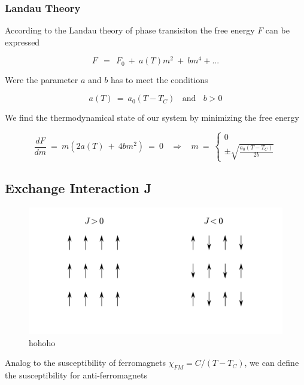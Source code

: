 \documentclass[10pt]{report}
\numberwithin{equation}{chapter}
\begin{document}
\subsubsection{Landau Theory}

According to the Landau theory of phase transisiton the free energy $F$ can be expressed

\begin{equation} \label{eq:ferromag_landau}
  F ~~=~~ F_0 ~+~ a(T) m^2 ~+~ b m^4 + ... 
\end{equation}

Were the parameter $a$ and $b$ has to meet the conditions

\begin{equation} \label{eq:ferromag_landau_condition}
  a(T) ~=~ a_0(T-T_C) ~~~~ \text{and} ~~~~ b>0
\end{equation}

We find the thermodynamical state of our system by minimizing the free energy

\begin{equation}
  \frac{dF}{dm} ~=~ m ( 2a(T) ~+~ 4bm^2) ~=~ 0 ~~~~ \Rightarrow ~~~~ m ~=~ \left\{ 
  \begin{array}{c}
    0\\
    \pm \sqrt{\frac{a_0(T-T_C)}{2b}}
  \end{array}
  \right.
\end{equation}



\subsection{Exchange Interaction J}


\begin{figure}
  \centering
  \includegraphics[width=0.7\linewidth]{../img/exch_spin_config.pdf}
  \caption{hohoho}
\end{figure}


Analog to the susceptibility of ferromagnets $\chi_{FM} = C/(T-T_C)$, we can define the susceptibility for anti-ferromagnets
\end{document}
